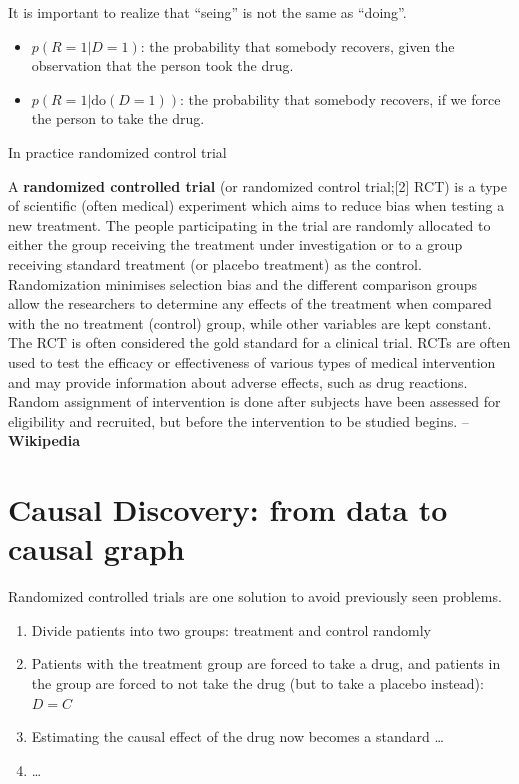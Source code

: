\documentclass[b5paper]{report}
\begin{document}
It is important to realize that ``seing'' is not the same as ``doing''.

\begin{itemize}
  \item $p(R = 1|D = 1)$: the probability that somebody recovers, given the
    observation that the person took the drug.
  \item $p(R = 1| \text{do}(D=1))$: the probability that somebody recovers, if
    we force the person to take the drug.
\end{itemize}

In practice randomized control trial

\begin{mybox}
  A \textbf{randomized controlled trial} (or randomized control trial;[2] RCT) is a type
of scientific (often medical) experiment which aims to reduce bias when testing
a new treatment. The people participating in the trial are randomly allocated
to either the group receiving the treatment under investigation or to a group
receiving standard treatment (or placebo treatment) as the control.
Randomization minimises selection bias and the different comparison groups
allow the researchers to determine any effects of the treatment when compared
with the no treatment (control) group, while other variables are kept constant.
The RCT is often considered the gold standard for a clinical trial. RCTs are
often used to test the efficacy or effectiveness of various types of medical
intervention and may provide information about adverse effects, such as drug
reactions. Random assignment of intervention is done after subjects have been
assessed for eligibility and recruited, but before the intervention to be
studied begins. -- \textbf{Wikipedia}
\end{mybox}

\section{Causal Discovery: from data to causal graph}

Randomized controlled trials \cite{fisher1935design} are one solution to avoid
previously seen problems.

\begin{enumerate}
  \item Divide patients into two groups: treatment and control randomly
  \item Patients with the treatment group are forced to take a drug, and
    patients in the group are forced to not take the drug (but to take a
    placebo instead): $D = C$
  \item Estimating the causal effect of the drug now becomes a standard \dots
  \item \dots
\end{enumerate}
\end{document}
